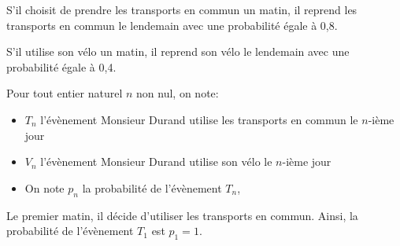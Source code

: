 
\medskip


S'il choisit de prendre les transports en commun un matin, il reprend les transports en
commun le lendemain avec une probabilité égale à 0,8.

S'il utilise son vélo un matin, il reprend son vélo le lendemain avec une probabilité égale
à 0,4.

\medskip

Pour tout entier naturel $n$ non nul, on note:
\begin{itemize}
\item  $T_n$ l'évènement \og Monsieur Durand utilise les transports en commun le $n$-ième jour\fg
\item  $V_n$ l'évènement \og  Monsieur Durand utilise son vélo le $n$-ième jour\fg
\item On note $p_n$ la probabilité de l'évènement $T_n$,
\end{itemize}

Le premier matin, il décide d'utiliser les transports en commun. Ainsi, la probabilité de
l'évènement $T_1$ est $p_1 = 1$.

